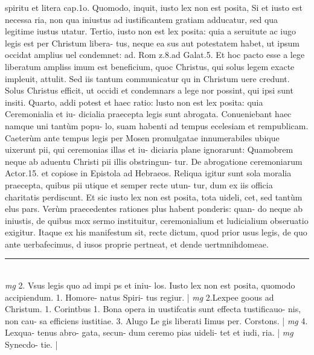 \documentclass{article}
\begin{document}
\begin{pages}
spiritu et litera cap.1o. Quomodo, inquit, iusto lex non est posita, Si et iusto est necessa ria, non qua iniustus ad iustificantem gratiam adducatur, sed qua legitime iustus utatur.  \pend\pstart Tertio, iusto non est lex posita: quia a seruitute ac iugo legis est per Christum libera- tus, neque  ea sus aut potestatem habet, ut ipsum occidat amplius uel condemnet: ad. Rom z.8.ad Galat.5. Et hoc pacto esse a lege liberatum ampliss imum est beneficium, quoc Christus, qui solus legem exacte impleuit, attulit. Sed iis tantum communicatur qu in Christum uere credunt. Solus Christus efficit, ut occidi et condemnars a lege nor possint, qui ipsi sunt insiti.  \pend\pstart Quarto, addi potest et haec ratio: lusto non est lex posita: quia Ceremonialia et iu- dicialia praecepta legis sunt abrogata. Conueniebant haec namque  uni tantùm popu- lo, suam habenti ad tempus ecelesiam et rempublicam. Caeterùm ante tempus legis per Mosen promulgatae innumerabiles ubique  uixerunt pii, qui ceremonias illas et iu- diciaria plane ignorarunt: Quamobrem neque  ab aduentu Christi pii illis obstringun- tur. De abrogatione ceremoniarum Actor.15. et copiose in Epistola ad Hebraeos. Reliqua igitur sunt sola moralia praecepta, quibus pii utique et semper recte utun- tur, dum ex iis officia charitatis perdiscunt. Et sic iusto lex non est posita, tota uideli, cet, sed tantùm elus pars. Verùm praecedentes rationes plus habent ponderis: quan- do neque ab iniustis, de quibus mox sermo instituitur, ceremonialium et ludicialium obseruatio exigitur. Itaque ex his manifestum sit, recte dictum, quod prior usus legis, de quo ante uerbafecimus, d iusos proprie pertneat, et dende uertmnihdomeae.  \pend
\vspace{0.5cm}\noindent
\vspace{0.2cm}\rule{1cm}{0.2pt}\\ 
\hspace{0.2cm}\textit{mg}
\footnotesize 2. Vsus legis quo ad impi ps et iniu- los. Iusto lex non est posita, quomodo accipiendum. 1. Homore- natus Spiri- tus regiur. 
\normalsize| 
\hspace{0.2cm}\textit{mg}
\footnotesize 2.Lexpee goous ad Christum. 1. Corintbus 1. Bona opera in uustifcatis sunt effecta tustificauo- nis, non cau- sa efficiens iustitiae. 3. Alugo Le gis liberati Iimus per. Corstons. 
\normalsize| 
\hspace{0.2cm}\textit{mg}
\footnotesize 4. Lexqua- tenus abro- gata, secun- dum ceremo pias uideli- tet et iudi, ria. 
\normalsize| 
\hspace{0.2cm}\textit{mg}
\footnotesize Synecdo- tie. 
\normalsize| 

\end{pages}
\end{document}
